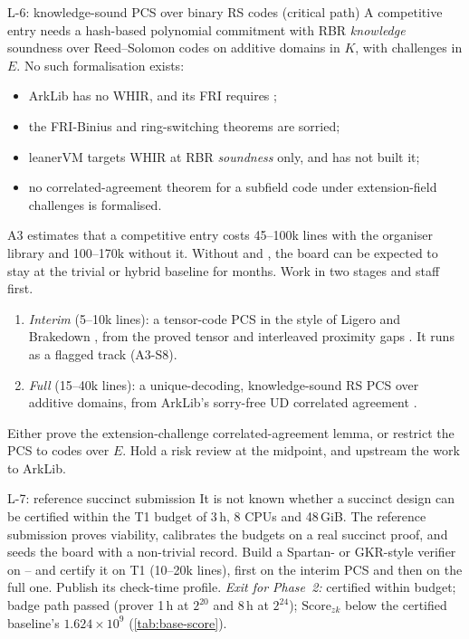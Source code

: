 \begin{issue}{L-6}{: knowledge-sound PCS over binary RS codes (critical path)}
\IRprob A competitive entry needs a hash-based polynomial commitment with RBR \emph{knowledge}
soundness over Reed--Solomon codes on additive domains in $K$, with challenges in $E$. No such
formalisation exists:
\begin{itemize}[nosep]
\item ArkLib has no WHIR, and its FRI requires ;
\item the FRI-Binius and ring-switching theorems are sorried;
\item leanerVM targets WHIR at RBR \emph{soundness} only, and has not built it;
\item no correlated-agreement theorem for a subfield code under extension-field challenges is
  formalised.
\end{itemize}
\IRwhy A3 estimates that a competitive entry costs 45--100k lines with the organiser library and
100--170k without it. Without  and , the board can be expected to stay at the
trivial or hybrid baseline for months.
\IRres Work in two stages and staff  first.
\begin{enumerate}[nosep,leftmargin=1.4em]
\item \emph{Interim} (5--10k lines): a tensor-code PCS in the style of Ligero and Brakedown
  \cite{AHIV17-Ligero,GLSTW23-Brakedown}, from the proved tensor and interleaved proximity gaps
  \cite{DG25-Interleaved}. It runs as a flagged track (A3-S8).
\item \emph{Full} (15--40k lines): a unique-decoding, knowledge-sound RS PCS over additive domains,
  from ArkLib's sorry-free UD correlated agreement \cite{BCIKS20}.
\end{enumerate}
Either prove the extension-challenge correlated-agreement lemma, or restrict the PCS to codes over
$E$. Hold a risk review at the midpoint, and upstream the work to ArkLib.
\end{issue}

\begin{issue}{L-7}{: reference succinct submission}
\IRprob It is not known whether a succinct design can be certified within the T1 budget of 3\,h,
8 CPUs and 48\,GiB.
\IRwhy The reference submission proves viability, calibrates the budgets on a real succinct
proof, and seeds the board with a non-trivial record.
\IRres Build a Spartan- or GKR-style verifier \cite{Set20-Spartan} on -- and
certify it on T1 (10--20k lines), first on the interim PCS and then on the full one. Publish its
check-time profile.
\emph{Exit for Phase~2:} certified within budget; badge path passed (prover 1\,h at $2^{20}$ and
8\,h at $2^{24}$); $\mathrm{Score}_{zk}$ below the certified baseline's $1.624\times10^9$
(\cref{tab:base-score}).
\end{issue}

